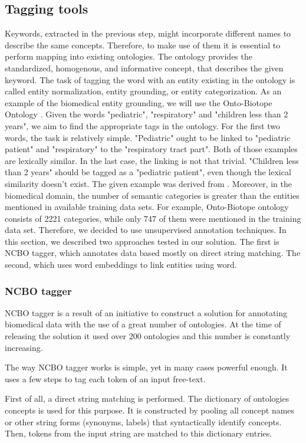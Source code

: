 \documentclass[11pt]{article}
\begin{document}
\subsection{Tagging tools}
Keywords, extracted in the previous step, might incorporate different names to describe the same concepts. Therefore, to make use of them it is essential to perform mapping into existing ontologies. The ontology provides the standardized, homogenous, and informative concept, that describes the given keyword. The task of tagging the word with an entity existing in the ontology is called entity normalization, entity grounding, or entity categorization. As an example of the biomedical entity grounding, we will use the Onto-Biotope Ontology \cite{Nédellec2018}. Given the words "pediatric", "respiratory" and "children less than 2 years", we aim to find the appropriate tags in the ontology. For the first two words, the task is relatively simple. "Pediatric" ought to be linked to "pediatric patient" and "respiratory" to the "respiratory tract part". Both of those examples are lexically similar. In the last case, the linking is not that trivial. "Children less than 2 years" should be tagged as a "pediatric patient", even though the lexical similarity doesn't exist. The given example was derived from \cite{Karadeniz2019}.  Moreover, in the biomedical domain, the number of semantic categories is greater than the entities mentioned in available training data sets. For example, Onto-Biotope ontology consists of 2221 categories, while only 747 of them were mentioned in the training data set. Therefore, we decided to use unsupervised annotation techniques. In this section, we described two approaches tested in our solution. The first is NCBO tagger, which annotates data based mostly on direct string matching. The second, which uses word embeddings to link entities using word. 

\subsubsection{NCBO tagger}
NCBO tagger \cite{NCBO} is a result of an initiative to construct a solution for annotating biomedical data with the use of a great number of ontologies. At the time of releasing the solution it used over 200 ontologies and this number is constantly increasing. 

The way NCBO tagger works is simple, yet in many cases powerful enough. It uses a few steps to tag each token of an input free-text. 

First of all, a direct string matching is performed. The dictionary of ontologies concepts is used for this purpose. It is constructed by pooling all concept
names or other string forms (synonyms, labels) that syntactically
identify concepts. Then, tokens from the input string are matched to this dictionary entries.
\end{document}
